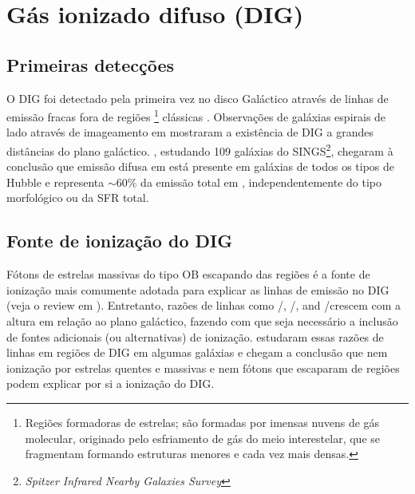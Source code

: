 \section{Gás ionizado difuso (DIG)}
\label{sec:intro:DIG}

\subsection{Primeiras detecções}
\label{sec:intro:DIG:first}
O DIG foi detectado pela primeira vez no disco Galáctico através de linhas de emissão fracas fora de regiões \Hii\footnote{Regiões formadoras de estrelas; são formadas por imensas nuvens de gás molecular, originado pelo esfriamento de gás do meio interestelar, que se fragmentam formando estruturas menores e cada vez mais densas.} clássicas \citep{Reynolds.PhD.1971}. Observações de galáxias espirais de lado  através de imageamento em \Ha \citep{Dettmar.1990, HoopesWaltGreen.1996, HoopesWaltRand.1999} mostraram a existência de DIG a grandes distâncias do plano galáctico. \cite{Oey.etal.2007}, estudando 109 galáxias do SINGS\footnote{\em Spitzer Infrared Nearby Galaxies Survey}, chegaram à conclusão que emissão difusa em \Ha está presente em galáxias de todos os tipos de Hubble e representa $\sim60\%$ da emissão total em \Ha, independentemente do tipo morfológico ou da SFR total.

\subsection{Fonte de ionização do DIG}
\label{sec:intro:DIG:source}
Fótons de estrelas massivas do tipo OB escapando das regiões \Hii é a fonte de ionização mais comumente adotada para explicar as linhas de emissão no DIG (veja o review em \citealt{Haffner.etal.2009}). Entretanto, razões de linhas como \nii/\Ha, \sii/\Ha, and \oiii/\Hb crescem com a altura em relação ao plano galáctico, fazendo com que seja necessário a inclusão de fontes adicionais (ou alternativas) de ionização. \citet{HoopesWalt.2003} estudaram essas razões de linhas em regiões de DIG em algumas galáxias e chegam a conclusão que nem ionização por estrelas quentes e massivas e nem fótons que escaparam de regiões \hii podem explicar por si a ionização do DIG.

